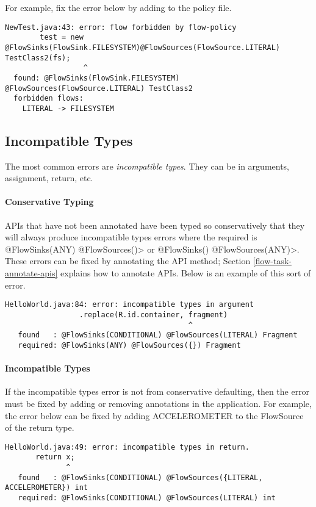 For example, fix the error below by adding  to the policy file.
\begin{Verbatim}
NewTest.java:43: error: flow forbidden by flow-policy  
        test = new @FlowSinks(FlowSink.FILESYSTEM)@FlowSources(FlowSource.LITERAL) TestClass2(fs);
                  ^
  found: @FlowSinks(FlowSink.FILESYSTEM) @FlowSources(FlowSource.LITERAL) TestClass2 
  forbidden flows:
    LITERAL -> FILESYSTEM
\end{Verbatim}

\subsection{Incompatible Types}
The most common errors are \emph{incompatible types}.  They can be in arguments,  assignment, return, etc.

\paragraph{Conservative Typing}

APIs that have not been annotated have been typed so conservatively that they will always produce incompatible types errors where the required is \<@FlowSinks(ANY) @FlowSources({})> or 
\<@FlowSinks({}) @FlowSources(ANY)>.  These errors can be fixed by annotating the API method; 
Section \ref{flow-task-annotate-apis} explains how to annotate APIs. 
Below is an example of this sort of error.

\begin{Verbatim}
HelloWorld.java:84: error: incompatible types in argument
                 .replace(R.id.container, fragment)
                                          ^
   found   : @FlowSinks(CONDITIONAL) @FlowSources(LITERAL) Fragment
   required: @FlowSinks(ANY) @FlowSources({}) Fragment
\end{Verbatim}

\paragraph{Incompatible Types}

If the incompatible types error is not from conservative defaulting, then the error must be fixed by adding or
removing annotations in the application.  For example, the error below can be fixed by adding ACCELEROMETER to the FlowSource of the return type.  

\begin{Verbatim}
HelloWorld.java:49: error: incompatible types in return.
       return x;
              ^
   found   : @FlowSinks(CONDITIONAL) @FlowSources({LITERAL, ACCELEROMETER}) int
   required: @FlowSinks(CONDITIONAL) @FlowSources(LITERAL) int
\end{Verbatim}

